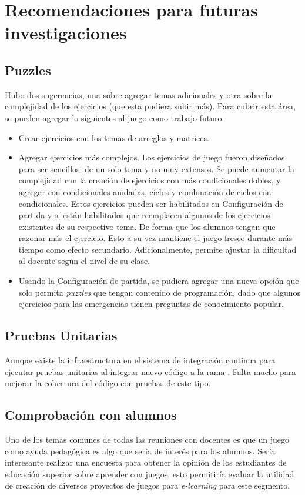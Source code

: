 \section{Recomendaciones para futuras investigaciones}
\subsection{Puzzles}
Hubo dos sugerencias, una sobre agregar temas adicionales y otra sobre la complejidad de los ejercicios (que esta pudiera subir más). Para cubrir esta área, se pueden agregar lo siguientes al juego como trabajo futuro:
\begin{itemize}
    \item Crear ejercicios con los temas de arreglos y matrices.
    
    \item Agregar ejercicios más complejos. Los ejercicios de juego fueron diseñados para ser sencillos: de un solo tema y no muy extensos. Se puede aumentar la complejidad con la creación de ejercicios con más condicionales dobles, y agregar  con condicionales anidadas, ciclos y combinación de ciclos con condicionales. Estos ejercicios pueden ser habilitados en Configuración de partida y si están habilitados que reemplacen algunos de los ejercicios existentes de su respectivo tema. De forma que los alumnos tengan que razonar más el ejercicio. Esto a su vez mantiene el juego fresco durante más tiempo como efecto secundario. Adicionalmente, permite ajustar la dificultad al docente según el nivel de su clase.
    
    \item Usando la Configuración de partida, se pudiera agregar una nueva opción que solo permita \textit{puzzles} que tengan contenido de programación, dado que algunos ejercicios para las emergencias tienen preguntas de conocimiento popular.
\end{itemize}

\subsection{Pruebas Unitarias}
Aunque existe la infraestructura en el sistema de integración continua para ejecutar pruebas unitarias al integrar nuevo código a la rama . Falta mucho para mejorar la cobertura del código con pruebas de este tipo. 

\subsection{Comprobación con alumnos}
Uno de los temas comunes de todas las reuniones con docentes es que un juego como ayuda pedagógica es algo que sería de interés para los alumnos. Sería interesante realizar una encuesta para obtener la opinión de los estudiantes de educación superior sobre aprender con juegos, esto permitiría evaluar la utilidad de creación de diversos proyectos de juegos para \textit{e-learning} para este segmento. 


